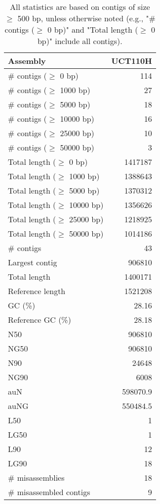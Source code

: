 \documentclass[12pt,a4paper]{article}
\begin{document}
\begin{table}[ht]
\begin{center}
\caption{All statistics are based on contigs of size $\geq$ 500 bp, unless otherwise noted (e.g., "\# contigs ($\geq$ 0 bp)" and "Total length ($\geq$ 0 bp)" include all contigs).}
\begin{tabular}{|l*{1}{|r}|}
\hline
Assembly & UCT110H \\ \hline
\# contigs ($\geq$ 0 bp) & 114 \\ \hline
\# contigs ($\geq$ 1000 bp) & 27 \\ \hline
\# contigs ($\geq$ 5000 bp) & 18 \\ \hline
\# contigs ($\geq$ 10000 bp) & 16 \\ \hline
\# contigs ($\geq$ 25000 bp) & 10 \\ \hline
\# contigs ($\geq$ 50000 bp) & 3 \\ \hline
Total length ($\geq$ 0 bp) & 1417187 \\ \hline
Total length ($\geq$ 1000 bp) & 1388643 \\ \hline
Total length ($\geq$ 5000 bp) & 1370312 \\ \hline
Total length ($\geq$ 10000 bp) & 1356626 \\ \hline
Total length ($\geq$ 25000 bp) & 1218925 \\ \hline
Total length ($\geq$ 50000 bp) & 1014186 \\ \hline
\# contigs & 43 \\ \hline
Largest contig & 906810 \\ \hline
Total length & 1400171 \\ \hline
Reference length & 1521208 \\ \hline
GC (\%) & 28.16 \\ \hline
Reference GC (\%) & 28.18 \\ \hline
N50 & 906810 \\ \hline
NG50 & 906810 \\ \hline
N90 & 24648 \\ \hline
NG90 & 6008 \\ \hline
auN & 598070.9 \\ \hline
auNG & 550484.5 \\ \hline
L50 & 1 \\ \hline
LG50 & 1 \\ \hline
L90 & 12 \\ \hline
LG90 & 18 \\ \hline
\# misassemblies & 18 \\ \hline
\# misassembled contigs & 9 \\ \hline

\end{tabular}
\end{center}
\end{table}
\end{document}
